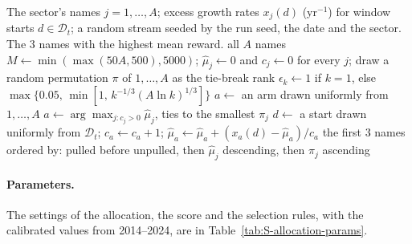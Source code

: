 \begin{algorithm}[tp]
\caption{Bandit selection rule for one sector at a pick on day $t$.}
\label{alg:S-bandit}
\begin{algorithmic}[1]
  \REQUIRE The sector's names $j = 1, \dots, A$; excess growth rates $x_j(d)$ (yr$^{-1}$) for window starts
    $d \in \mathcal{D}_t$; a random stream seeded by the run seed, the date and the sector.
  \ENSURE The $3$ names with the highest mean reward.
    \RETURN all $A$ names
  \ENDIF
  \STATE $M \gets \min(\max(50A, 500), 5000)$; $\hat\mu_j \gets 0$ and $c_j \gets 0$ for every $j$; draw a random
    permutation $\pi$ of $1, \dots, A$ as the tie-break rank
    \STATE $\epsilon_k \gets 1$ if $k = 1$, else $\max\{0.05,\, \min[1,\, k^{-1/3} (A \ln k)^{1/3}]\}$
      \STATE $a \gets$ an arm drawn uniformly from $1, \dots, A$ \hfill {}
    \ELSE
      \STATE $a \gets \arg\max_{j : c_j > 0} \hat\mu_j$, ties to the smallest $\pi_j$ \hfill {}
    \ENDIF
    \STATE $d \gets$ a start drawn uniformly from $\mathcal{D}_t$; $c_a \gets c_a + 1$;
      $\hat\mu_a \gets \hat\mu_a + (x_a(d) - \hat\mu_a)/c_a$
  \ENDFOR
  \RETURN the first $3$ names ordered by: pulled before unpulled, then $\hat\mu_j$ descending, then $\pi_j$ ascending
\end{algorithmic}
\end{algorithm}

\paragraph{Parameters.}
The settings of the allocation, the score and the selection rules, with the calibrated values from 2014--2024, are
in Table~\ref{tab:S-allocation-params}.

\clearpage

